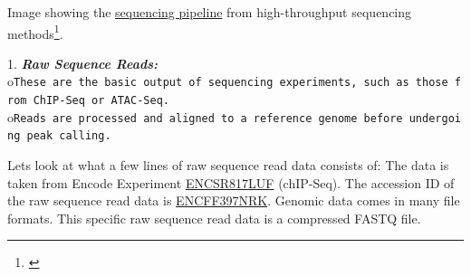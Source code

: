 \documentclass[
]{book}
\begin{document}
Image showing the \href{https://compgenomr.github.io/book/images/HTseq.png}{sequencing pipeline} from high-throughput sequencing methods\footnote{\citet{akalin2020}}.

1. \textbf{\emph{Raw Sequence Reads:}}
o\texttt{These\ are\ the\ basic\ output\ of\ sequencing\ experiments,\ such\ as\ those\ from\ ChIP-Seq\ or\ ATAC-Seq.}
o\texttt{Reads\ are\ processed\ and\ aligned\ to\ a\ reference\ genome\ before\ undergoing\ peak\ calling.}

Lets look at what a few lines of raw sequence read data consists of:
The data is taken from Encode Experiment \href{https://www.encodeproject.org/experiments/ENCSR817LUF/}{ENCSR817LUF} (chIP-Seq). The accession ID of the raw sequence read data is \href{https://www.encodeproject.org/files/ENCFF397NRK/}{ENCFF397NRK}. Genomic data comes in many file formats. This specific raw sequence read data is a compressed FASTQ file.
\end{document}
